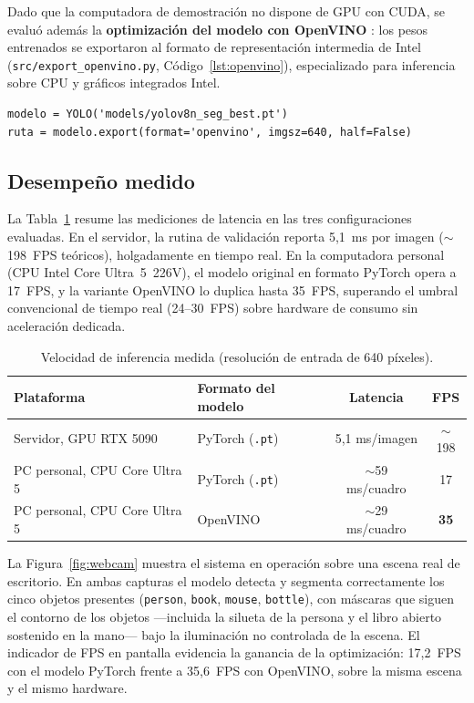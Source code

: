 \documentclass[11pt,a4paper]{article}
\begin{document}
Dado que la computadora de demostración no dispone de GPU con CUDA, se evaluó
además la \textbf{optimización del modelo con OpenVINO} \cite{openvino}: los
pesos entrenados se exportaron al formato de representación intermedia de
Intel (\texttt{src/export\_openvino.py}, Código~\ref{lst:openvino}),
especializado para inferencia sobre CPU y gráficos integrados Intel.

\begin{lstlisting}[style=py,caption={Exportación de los pesos entrenados al
formato OpenVINO para acelerar la inferencia sobre CPU
Intel.},label={lst:openvino}]
modelo = YOLO('models/yolov8n_seg_best.pt')
ruta = modelo.export(format='openvino', imgsz=640, half=False)
\end{lstlisting}

\subsection{Desempeño medido}

La Tabla~\ref{tab:velocidad} resume las mediciones de latencia en las tres
configuraciones evaluadas. En el servidor, la rutina de validación reporta
5,1~ms por imagen ($\sim$198~FPS teóricos), holgadamente en tiempo real. En
la computadora personal (CPU Intel Core Ultra~5~226V), el modelo original en
formato PyTorch opera a 17~FPS, y la variante OpenVINO lo duplica hasta
35~FPS, superando el umbral convencional de tiempo real (24--30~FPS) sobre
hardware de consumo sin aceleración dedicada.

\begin{table}[H]
  \centering
  \small
  \caption{Velocidad de inferencia medida (resolución de entrada de 640
  píxeles).}
  \label{tab:velocidad}
  \begin{tabular}{@{}llcc@{}}
    \toprule
    \textbf{Plataforma} & \textbf{Formato del modelo} & \textbf{Latencia} & \textbf{FPS} \\
    \midrule
    Servidor, GPU RTX 5090 & PyTorch (\texttt{.pt}) & 5,1 ms/imagen & $\sim$198 \\
    PC personal, CPU Core Ultra 5 & PyTorch (\texttt{.pt}) & $\sim$59 ms/cuadro & 17 \\
    PC personal, CPU Core Ultra 5 & OpenVINO & $\sim$29 ms/cuadro & \textbf{35} \\
    \bottomrule
  \end{tabular}
\end{table}

La Figura~\ref{fig:webcam} muestra el sistema en operación sobre una escena
real de escritorio. En ambas capturas el modelo detecta y segmenta
correctamente los cinco objetos presentes (\texttt{person}, \texttt{book},
\texttt{mouse}, \texttt{bottle}), con máscaras que siguen el contorno de los
objetos ---incluida la silueta de la persona y el libro abierto sostenido en
la mano--- bajo la iluminación no controlada de la escena. El indicador de
FPS en pantalla evidencia la ganancia de la optimización: 17,2~FPS con el
modelo PyTorch frente a 35,6~FPS con OpenVINO, sobre la misma escena y el
mismo hardware.
\end{document}
